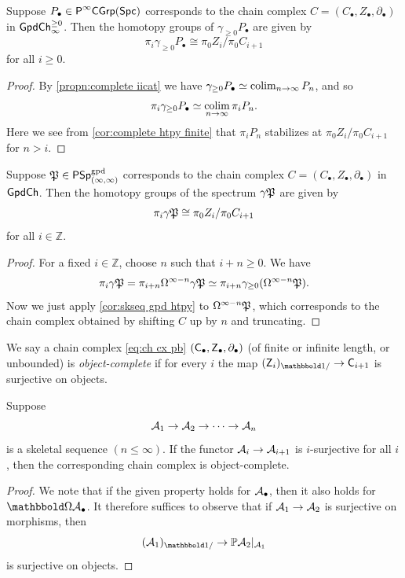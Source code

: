 \documentclass[a4paper,11pt]{article}
\begin{document}
\begin{cor}\label{cor:skseq gpd htpy}
  Suppose $P_{\bullet} \in \PCGrp[\infty]$ corresponds to the chain complex
  $C=(C_{\bullet}, Z_{\bullet}, \partial_{\bullet})$ in
  $\GpdChp_{\infty}$.
  Then the
  homotopy groups of $\gamma_{\geq 0} P_{\bullet}$ are given by
  \[ \pi_{i}\gamma_{\geq 0}P_{\bullet} \cong \pi_{0}Z_{i}/\pi_{0}C_{i+1}
  \]
  for all $i \geq 0$.
\end{cor}
\begin{proof}
  By \cref{propn:complete iicat} we have $\gamma_{\geq 0} P_{\bullet} \simeq
  \colimP_{n \rightarrow \infty} P_{n}$, and so
  \[ \pi_{i} \gamma_{\geq 0} P_{\bullet} \simeq \colimP_{n \rightarrow \infty}
    \pi_{i} P_{n}.\] Here we see from \cref{cor:complete htpy finite}
  that $\pi_{i} P_{n}$ stabilizes at $\pi_{0}Z_{i}/\pi_{0}C_{i+1}$ for
  $n > i$.
\end{proof}

\begin{cor}\label{cor:psp gpd htpy}
  Suppose $\spP \in \PSpIIgpd$
  corresponds to the chain complex
  $C=(C_{\bullet}, Z_{\bullet}, \partial_{\bullet})$ in
  $\GpdCh$.
  Then the
  homotopy groups of the spectrum $\gamma \spP$ are given by
  \[ \pi_{i}\gamma \spP \cong \pi_{0}Z_{i}/\pi_{0}C_{i+1}
  \]
  for all $i \in \mathbb{Z}$.
\end{cor}
\begin{proof}
  For a fixed $i \in \mathbb{Z}$, choose $n$ such that $i+n \geq 0$.
  We have
  \[
    \pi_{i}\gamma \spP = \pi_{i+n} \Omega^{\infty-n}\gamma\spP \simeq
    \pi_{i+n} \gamma_{\geq 0}(\Omega^{\infty-n}\spP).
  \]
  Now we just apply \cref{cor:skseq gpd htpy} to $\Omega^{\infty-n}\spP$,
  which corresponds to the chain complex obtained by shifting $C$ up
  by $n$ and truncating.
\end{proof}

\begin{defn}
  We say a chain complex \cref{eq:ch cx pb}
  $(\oC_{\bullet},\oZ_{\bullet},\partial_{\bullet})$ (of finite or
  infinite length, or unbounded) is
  \emph{object-complete} if for every $i$ the map $(\oZ_{i})_{\bbone/}
  \to \oC_{i+1}$ is surjective on objects.
\end{defn}

\begin{lemma}
  Suppose
  \[ \nA_{1} \to \nA_{2} \to \cdots \to \nA_{n} \]
  is a skeletal sequence $(n \leq \infty)$. If the functor $\nA_{i}
  \to \nA_{i+1}$ is $i$-surjective for all $i$, then the corresponding
  chain complex is object-complete.
\end{lemma}
\begin{proof}
  We note that if the given property holds for $\nA_{\bullet}$, then it also
  holds for $\mOm \nA_{\bullet}$. It therefore suffices to observe that if
  $\nA_{1} \to \nA_{2}$ is surjective on morphisms, then
  \[(\nA_{1})_{\bbone/} \to \mP \nA_{2}|_{\nA_{1}}\] is surjective on
  objects.
\end{proof}
\end{document}
